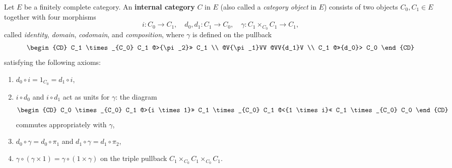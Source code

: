 Let $E$ be a finitely complete category. An \textbf{internal category} $C$ in $E$ (also called a \textit{category object} in $E$) consists of two objects $C_0, C_1 \in E$ together with four morphisms
$$
i : C_0 \to C_1, \quad d_0, d_1 : C_1 \to C_0, \quad \gamma : C_1 \times_{C_0} C_1 \to C_1,
$$
called \textit{identity}, \textit{domain}, \textit{codomain}, and \textit{composition}, where $\gamma$ is defined on the pullback
$$
\begin{CD}
C_1 \times_{C_0} C_1 @>{\pi_2}>> C_1 \\
@V{\pi_1}VV @VV{d_1}V \\
C_1 @>>{d_0}> C_0
\end{CD}
$$
satisfying the following axioms:
\begin{enumerate}
\item $d_0 \circ i = 1_{C_0} = d_1 \circ i$,
\item $i \circ d_0$ and $i \circ d_1$ act as units for $\gamma$: the diagram
$$
\begin{CD}
C_0 \times_{C_0} C_1 @>{i \times 1}>> C_1 \times_{C_0} C_1 @<{1 \times i}<< C_1 \times_{C_0} C_0
\end{CD}
$$
commutes appropriately with $\gamma$,
\item $d_0 \circ \gamma = d_0 \circ \pi_1$ and $d_1 \circ \gamma = d_1 \circ \pi_2$,
\item $\gamma \circ (\gamma \times 1) = \gamma \circ (1 \times \gamma)$ on the triple pullback $C_1 \times_{C_0} C_1 \times_{C_0} C_1$.
\end{enumerate}
